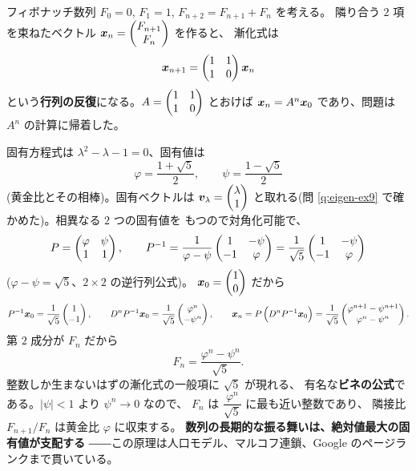 \begin{rei}[ビネの公式]\label{rei:power-binet}
フィボナッチ数列 $F_0 = 0$, $F_1 = 1$, $F_{n+2} = F_{n+1} + F_n$ を考える。
隣り合う $2$ 項を束ねたベクトル $\bm{x}_n = \begin{pmatrix}F_{n+1} \\ F_n\end{pmatrix}$ を作ると、
漸化式は
\[
\bm{x}_{n+1} = \begin{pmatrix}1 & 1 \\ 1 & 0\end{pmatrix} \bm{x}_n
\]
という\textbf{行列の反復}になる。$A = \begin{pmatrix}1 & 1 \\ 1 & 0\end{pmatrix}$ とおけば
$\bm{x}_n = A^n \bm{x}_0$ であり、問題は $A^n$ の計算に帰着した。

固有方程式は $\lambda^2 - \lambda - 1 = 0$、固有値は
\[
\varphi = \frac{1 + \sqrt{5}}{2}, \qquad \psi = \frac{1 - \sqrt{5}}{2}
\]
(黄金比とその相棒)。固有ベクトルは $\bm{v}_\lambda = \begin{pmatrix}\lambda \\ 1\end{pmatrix}$
と取れる(問 \ref{q:eigen-ex9} で確かめた)。相異なる $2$ つの固有値を
もつので対角化可能で、
\[
P = \begin{pmatrix}\varphi & \psi \\ 1 & 1\end{pmatrix}, \qquad
P^{-1} = \frac{1}{\varphi - \psi}\begin{pmatrix}1 & -\psi \\ -1 & \varphi\end{pmatrix}
= \frac{1}{\sqrt{5}}\begin{pmatrix}1 & -\psi \\ -1 & \varphi\end{pmatrix}
\]
($\varphi - \psi = \sqrt{5}$、$2 \times 2$ の逆行列公式)。
$\bm{x}_0 = \begin{pmatrix}1 \\ 0\end{pmatrix}$ だから
\[
P^{-1}\bm{x}_0 = \frac{1}{\sqrt{5}}\begin{pmatrix}1 \\ -1\end{pmatrix}, \qquad
D^n P^{-1}\bm{x}_0 = \frac{1}{\sqrt{5}}\begin{pmatrix}\varphi^n \\ -\psi^n\end{pmatrix}, \qquad
\bm{x}_n = P\,\Bigl(D^n P^{-1}\bm{x}_0\Bigr)
= \frac{1}{\sqrt{5}}\begin{pmatrix}\varphi^{n+1} - \psi^{n+1} \\ \varphi^n - \psi^n\end{pmatrix}.
\]
第 $2$ 成分が $F_n$ だから
\[
F_n = \frac{\varphi^n - \psi^n}{\sqrt{5}}.
\]
整数しか生まないはずの漸化式の一般項に $\sqrt{5}$ が現れる、
有名な\textbf{ビネの公式}である。$|\psi| < 1$ より $\psi^n \to 0$ なので、
$F_n$ は $\dfrac{\varphi^n}{\sqrt{5}}$ に最も近い整数であり、
隣接比 $F_{n+1}/F_n$ は黄金比 $\varphi$ に収束する。
\textbf{数列の長期的な振る舞いは、絶対値最大の固有値が支配する}
――この原理は人口モデル、マルコフ連鎖、Google のページランクまで貫いている。
\end{rei}

